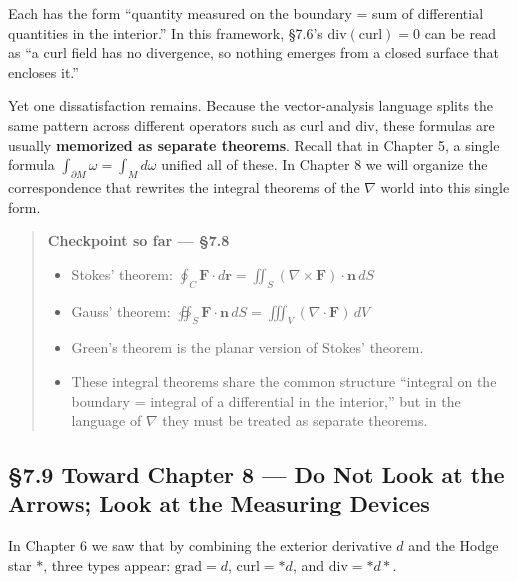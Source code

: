 \documentclass[a4paper,12pt,openany]{book}
\begin{document}
Each has the form ``quantity measured on the boundary = sum of
differential quantities in the interior.'' In this framework, §7.6's
\(\mathrm{div}(\mathrm{curl})=0\) can be read as ``a curl field has no
divergence, so nothing emerges from a closed surface that encloses it.''

Yet one dissatisfaction remains. Because the vector-analysis language
splits the same pattern across different operators such as curl and div,
these formulas are usually \textbf{memorized as separate theorems}.
Recall that in Chapter 5, a single formula
\(\int_{\partial M}\omega = \int_M d\omega\) unified all of these. In
Chapter 8 we will organize the correspondence that rewrites the integral
theorems of the \(\nabla\) world into this single form.

\begin{quote}
\textbf{Checkpoint so far — §7.8}

\begin{itemize}
\item
  Stokes' theorem:
  \(\oint_C \mathbf{F}\cdot d\mathbf{r} = \iint_S (\nabla\times\mathbf{F})\cdot\mathbf{n}\,dS\)
\item
  Gauss' theorem:
  \(\oiint_S \mathbf{F}\cdot\mathbf{n}\,dS = \iiint_V (\nabla\cdot\mathbf{F})\,dV\)
\item
  Green's theorem is the planar version of Stokes' theorem.
\item
  These integral theorems share the common structure ``integral on the
  boundary = integral of a differential in the interior,'' but in the
  language of \(\nabla\) they must be treated as separate theorems.
\end{itemize}
\end{quote}

\par\vspace{0.35em}\par

\hypertarget{toward-chapter-8-do-not-look-at-the-arrows-look-at-the-measuring-devices}{%
\subsection{§7.9 Toward Chapter 8 — Do Not Look at the Arrows; Look at
the Measuring
Devices}\label{toward-chapter-8-do-not-look-at-the-arrows-look-at-the-measuring-devices}}

In Chapter 6 we saw that by combining the exterior derivative \(d\) and
the Hodge star \(\ast\), three types appear: \(\mathrm{grad}=d\),
\(\mathrm{curl}=\ast d\), and \(\mathrm{div}=\ast d\ast\).
\end{document}
